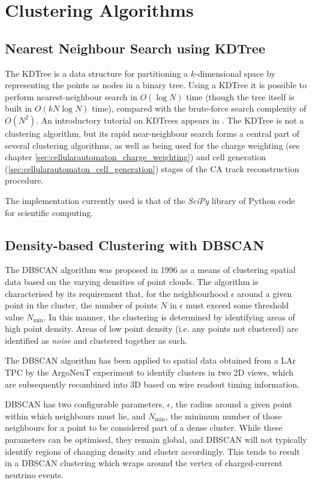 \chapter{Clustering Algorithms}

\section{Nearest Neighbour Search using \acs{KDTree}}
The \ac{KDTree} is a data structure for partitioning a $k$-dimensional space by representing the points as nodes in a binary tree. Using a \ac{KDTree} it is possible to perform nearest-neighbour search in $O(\log N)$ time\citep{Bentley1975} (though the tree itself is built in $O(kN\log N)$ time), compared with the brute-force search complexity of $O(N^2)$. An introductory tutorial on \aclp{KDTree} appears in \citep{Moore1991}. The \ac{KDTree} is not a clustering algorithm, but its rapid near-neighbour search forms a central part of several clustering algorithms, as well as being used for the charge weighting (see chapter \ref{sec:cellularautomaton_charge_weighting}) and cell generation (\ref{sec:cellularautomaton_cell_generation}) stages of the \acl{CA} track reconstruction procedure.

The implementation currently used is that of the \emph{SciPy} library of Python code for scientific computing.


\section{Density-based Clustering with \acs{DBSCAN}}
The \ac{DBSCAN} algorithm was proposed in 1996 as a means of clustering spatial data based on the varying densities of point clouds\citep{Ester1996}. The algorithm is characterised by its requirement that, for the neighbourhood $\epsilon$ around a given point in the cluster, the number of points $N$ in $\epsilon$ must exceed some threshold value $N_\mathrm{min}$. In this manner, the clustering is determined by identifying areas of high point density. Areas of low point density (i.e. any points not clustered) are identified as \emph{noise} and clustered together as such.

The \ac{DBSCAN} algorithm has been applied to spatial data obtained from a \ac{LAr TPC} by the ArgoNeuT experiment\cite{Spitz2011} to identify clusters in two 2D views, which are subsequently recombined into 3D based on wire readout timing information.

\ac{DBSCAN} has two configurable parameters, $\epsilon$, the radius around a given point within which neighbours must lie, and $N_\mathrm{min}$, the minimum number of those neighbours for a point to be considered part of a dense cluster. While these parameters can be optimised, they remain global, and \ac{DBSCAN} will not typically identify regions of changing density and cluster accordingly. This tends to result in a \ac{DBSCAN} clustering which wraps around the vertex of charged-current neutrino events.

